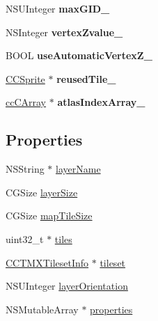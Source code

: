 \begin{DoxyCompactItemize}
\item 
\hypertarget{interface_c_c_t_m_x_layer_a5f90541c70209a7f5c9a6e4921f67fb9}{N\-S\-U\-Integer {\bfseries max\-G\-I\-D\-\_\-}}\label{interface_c_c_t_m_x_layer_a5f90541c70209a7f5c9a6e4921f67fb9}

\item 
\hypertarget{interface_c_c_t_m_x_layer_a407c28600f59813804de9dafe6a5c511}{N\-S\-Integer {\bfseries vertex\-Zvalue\-\_\-}}\label{interface_c_c_t_m_x_layer_a407c28600f59813804de9dafe6a5c511}

\item 
\hypertarget{interface_c_c_t_m_x_layer_a09779adfe3d1623075c54bd077077659}{B\-O\-O\-L {\bfseries use\-Automatic\-Vertex\-Z\-\_\-}}\label{interface_c_c_t_m_x_layer_a09779adfe3d1623075c54bd077077659}

\item 
\hypertarget{interface_c_c_t_m_x_layer_adb619b53d05e04a937ec7e9ce650fbb4}{\hyperlink{class_c_c_sprite}{C\-C\-Sprite} $\ast$ {\bfseries reused\-Tile\-\_\-}}\label{interface_c_c_t_m_x_layer_adb619b53d05e04a937ec7e9ce650fbb4}

\item 
\hypertarget{interface_c_c_t_m_x_layer_a1e928e1923db5c5eb598dd7309da71d3}{\hyperlink{structcc_array}{cc\-C\-Array} $\ast$ {\bfseries atlas\-Index\-Array\-\_\-}}\label{interface_c_c_t_m_x_layer_a1e928e1923db5c5eb598dd7309da71d3}

\end{DoxyCompactItemize}
\subsection*{Properties}
\begin{DoxyCompactItemize}
\item 
N\-S\-String $\ast$ \hyperlink{interface_c_c_t_m_x_layer_ae62640f00d84efb58df4eb90e3913700}{layer\-Name}
\item 
C\-G\-Size \hyperlink{interface_c_c_t_m_x_layer_a4d680b868f0e476d8a51e52d3c4ff64e}{layer\-Size}
\item 
C\-G\-Size \hyperlink{interface_c_c_t_m_x_layer_a13536a56d5a74341e766d8918a2c9013}{map\-Tile\-Size}
\item 
uint32\-\_\-t $\ast$ \hyperlink{interface_c_c_t_m_x_layer_a37c6ea184edaec1b0ba8f82cf2c386c8}{tiles}
\item 
\hyperlink{interface_c_c_t_m_x_tileset_info}{C\-C\-T\-M\-X\-Tileset\-Info} $\ast$ \hyperlink{interface_c_c_t_m_x_layer_afb0c60d744928f1ebbe66010448cdcce}{tileset}
\item 
N\-S\-U\-Integer \hyperlink{interface_c_c_t_m_x_layer_ab1be7f739da6da05fbc11da0e2c647f9}{layer\-Orientation}
\item 
N\-S\-Mutable\-Array $\ast$ \hyperlink{interface_c_c_t_m_x_layer_a3fcc631e6c87920daa231095c62b3344}{properties}
\end{DoxyCompactItemize}


